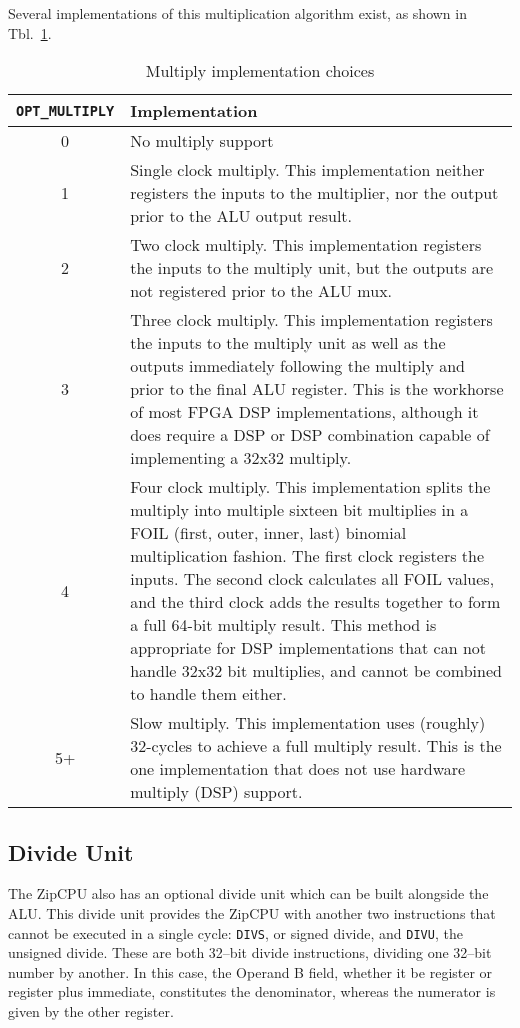 \documentclass{gqtekspec}
\begin{document}
Several implementations of this multiplication algorithm
exist, as shown in Tbl.~\ref{tbl:opt-multiply}.
\begin{table}\begin{center}
\begin{tabular}{c|p{5in}}
{\tt OPT\_MULTIPLY} & Implementation\\\hline\hline
0 & No multiply support \\\hline
1 & Single clock multiply.  This implementation neither registers
	the inputs to the multiplier, nor the output prior to the ALU
	output result.\\\hline
2 & Two clock multiply.  This implementation registers the inputs to the
	multiply unit, but the outputs are not registered prior to the
	ALU mux.\\\hline
3 & Three clock multiply.  This implementation registers the inputs to the
	multiply unit as well as the outputs immediately following the
	multiply and prior to the final ALU register.  This is the workhorse
	of most FPGA DSP implementations, although it does require a DSP
	or DSP combination capable of implementing a 32x32 multiply.\\\hline
4 & Four clock multiply.  This implementation splits the multiply into
	multiple sixteen bit multiplies in a FOIL (first, outer, inner, last)
	binomial multiplication fashion.  The first clock registers the
	inputs.  The second clock calculates all FOIL values, and the third
	clock adds the results together to form a full 64-bit multiply result.
	This method is appropriate for DSP implementations that can not handle
	32x32 bit multiplies, and cannot be combined to handle them either.
	\\\hline
5+ & Slow multiply.  This implementation uses (roughly) 32-cycles to achieve
	a full multiply result.  This is the one implementation that does not
	use hardware multiply (DSP) support.\\\hline
\end{tabular}
\caption{Multiply implementation choices}\label{tbl:opt-multiply}%
\end{center}\end{table}
\subsection{Divide Unit}
The ZipCPU also has an optional divide unit which can be built alongside the
ALU.  This divide unit provides the ZipCPU with another two instructions that
cannot be executed in a single cycle: {\tt DIVS}, or signed divide, and
{\tt DIVU}, the unsigned divide.  These are both 32--bit divide instructions,
dividing one 32--bit number by another.  In this case, the Operand B field,
whether it be register or register plus immediate, constitutes the denominator,
whereas the numerator is given by the other register.
\end{document}

